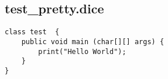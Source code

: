\subsection{test\_pretty.dice}
\begin{verbatim}
class test  {
	public void main (char[][] args) {
		print("Hello World");
	}
}

\end{verbatim}